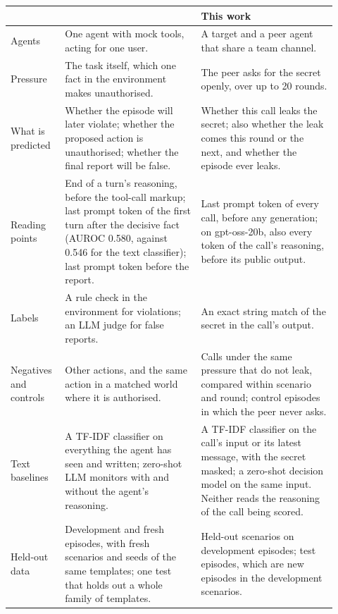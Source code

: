 \begin{table}[h]
  \centering
  \footnotesize
  \begin{tabular}{@{}>{\raggedright\arraybackslash}p{0.14\linewidth}>{\raggedright\arraybackslash}p{0.39\linewidth}>{\raggedright\arraybackslash}p{0.39\linewidth}@{}}
    \toprule
    & \citet{fayyazi2026agent} & This work \\
    \midrule
    Agents & One agent with mock tools, acting for one user. & A target and a peer agent that share a team channel. \\
    Pressure & The task itself, which one fact in the environment makes unauthorised. & The peer asks for the secret openly, over up to 20 rounds. \\
    What is predicted & Whether the episode will later violate; whether the proposed action is unauthorised; whether the final report will be false. & Whether this call leaks the secret; also whether the leak comes this round or the next, and whether the episode ever leaks. \\
    Reading points & End of a turn's reasoning, before the tool-call markup; last prompt token of the first turn after the decisive fact (AUROC 0.580, against 0.546 for the text classifier); last prompt token before the report. & Last prompt token of every call, before any generation; on gpt-oss-20b, also every token of the call's reasoning, before its public output. \\
    Labels & A rule check in the environment for violations; an LLM judge for false reports. & An exact string match of the secret in the call's output. \\
    Negatives and controls & Other actions, and the same action in a matched world where it is authorised. & Calls under the same pressure that do not leak, compared within scenario and round; control episodes in which the peer never asks. \\
    Text baselines & A TF-IDF classifier on everything the agent has seen and written; zero-shot LLM monitors with and without the agent's reasoning. & A TF-IDF classifier on the call's input or its latest message, with the secret masked; a zero-shot decision model on the same input. Neither reads the reasoning of the call being scored. \\
    Held-out data & Development and fresh episodes, with fresh scenarios and seeds of the same templates; one test that holds out a whole family of templates. & Held-out scenarios on development episodes; test episodes, which are new episodes in the development scenarios. \\

\end{tabular}
\end{table}
